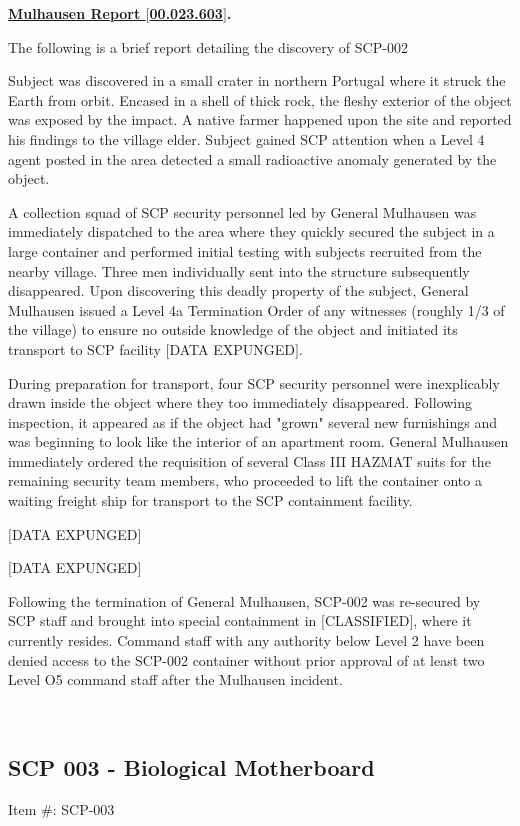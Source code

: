 \documentclass[a4paper, 11pt]{article}
\newenvironment{bordered}[1]%
{\begin{boxedminipage}{\textwidth}\textbf{\underline{#1}.}}
{\end{boxedminipage}\\[1em]}
\newcommand{\lb}{\ensuremath{[}}
\newcommand{\rb}{\ensuremath{]}}
\newcommand{\expunged}{\lb DATA EXPUNGED\rb}
\newcommand{\classified}{\lb CLASSIFIED\rb}
\begin{document}
\begin{bordered}{Mulhausen Report \lb 00.023.603\rb}

The following is a brief report detailing the discovery of SCP-002

Subject was discovered in a small crater in northern Portugal where it struck the Earth from orbit. Encased in a shell of thick rock, the fleshy exterior of the object was exposed by the impact. A native farmer happened upon the site and reported his findings to the village elder. Subject gained SCP attention when a Level 4 agent posted in the area detected a small radioactive anomaly generated by the object.

A collection squad of SCP security personnel led by General Mulhausen was immediately dispatched to the area where they quickly secured the subject in a large container and performed initial testing with subjects recruited from the nearby village. Three men individually sent into the structure subsequently disappeared. Upon discovering this deadly property of the subject, General Mulhausen issued a Level 4a Termination Order of any witnesses (roughly 1/3 of the village) to ensure no outside knowledge of the object and initiated its transport to SCP facility \expunged.

During preparation for transport, four SCP security personnel were inexplicably drawn inside the object where they too immediately disappeared. Following inspection, it appeared as if the object had "grown" several new furnishings and was beginning to look like the interior of an apartment room. General Mulhausen immediately ordered the requisition of several Class III HAZMAT suits for the remaining security team members, who proceeded to lift the container onto a waiting freight ship for transport to the SCP containment facility.

\expunged

\expunged

Following the termination of General Mulhausen, SCP-002 was re-secured by SCP staff and brought into special containment in \classified, where it currently resides. Command staff with any authority below Level 2 have been denied access to the SCP-002 container without prior approval of at least two Level O5 command staff after the Mulhausen incident.

\end{bordered}

\subsection{SCP 003 - Biological Motherboard}
Item \#: SCP-003
\end{document}
